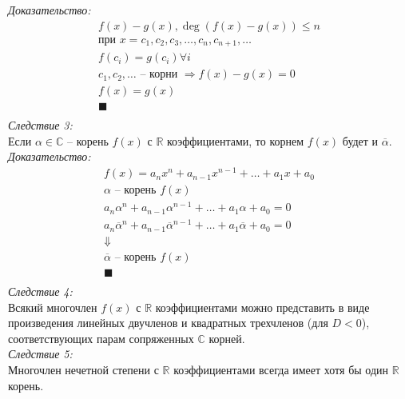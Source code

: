 \documentclass[12pt, fleqn]{article}
\begin{document}
\textit{Доказательство:}
\begin{multline*}
	f(x)-g(x), \deg \left(f(x) - g(x)\right) \leq n\\
	\text{при } x=c_1, c_2, c_3, \dots , c_n, c_{n+1}, \dots \\
	f(c_i) = g(c_i) \forall i\\
	c_1, c_2, \dots  \text{ -- корни }\Rightarrow f(x)-g(x)=0\\
	f(x) = g(x)\\
	\blacksquare\\
\end{multline*}
\textit{Следствие 3:}\\
Если $\alpha \in \mathbb{C}$ -- корень $f(x)$ с $\mathbb{R}$ коэффициентами, то корнем $f(x)$ будет и $\overline{\alpha}$.\\
\textit{Доказательство:}
\begin{multline*}
	f(x)=a_nx^n+a_{n-1}x^{n-1}+\dots +a_1x+a_0\\
	\alpha \text{ -- корень }f(x)\\
	a_n\alpha^n+a_{n-1}\alpha^{n-1}+\dots +a_1\alpha+a_0 = 0\\
	a_n\overline{\alpha}^n+a_{n-1}\overline{\alpha}^{n-1}+\dots +a_1\overline{\alpha}+a_0 = 0\\
	\Downarrow\\
	\overline{\alpha} \text{ -- корень }f(x)\\
	\blacksquare\\
\end{multline*}
\textit{Следствие 4:}\\
Всякий многочлен $f(x)$ с $\mathbb{R}$ коэффициентами можно представить в виде произведения линейных двучленов и квадратных трехчленов (для $D < 0$), соответствующих парам сопряженных $\mathbb{C}$ корней.\\
\textit{Следствие 5:}\\
Многочлен нечетной степени с $\mathbb{R}$ коэффициентами всегда имеет хотя бы один $\mathbb{R}$ корень.
\end{document}
